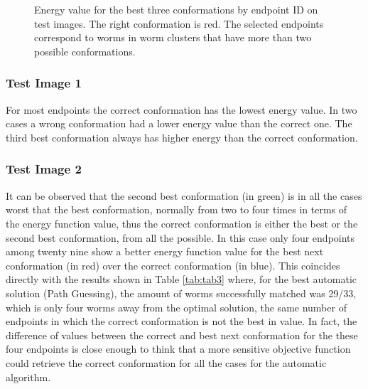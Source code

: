 \begin{figure}[htp]
  \begin{center}
     \\
     \\
  \end{center}
  \caption{Energy value for the best three conformations by endpoint ID on test
images. The right conformation is red. The selected endpoints correspond to worms in worm clusters that
have more than two possible conformations.}
  \label{fig:energy123}
\end{figure}


\subsubsection*{Test Image 1}


For most endpoints the correct conformation has the lowest energy value.
In two cases a wrong conformation had a lower energy value than the correct
one. The third best conformation always has higher energy than the correct conformation.\\

\subsubsection*{Test Image 2}


It can be observed that the second best conformation (in green) is in all 
the cases worst that the best conformation, normally from two to four times 
in terms of the energy function value, thus the correct conformation is 
either the best or the second best conformation, from all the possible.
In this case only four endpoints among twenty nine show a better energy
function value for the best next conformation (in red) over the correct 
conformation (in blue). This coincides directly with the results shown
in Table \ref{tab:tab3} where, for the best automatic solution (Path Guessing),
the amount of worms successfully matched was 29/33, which is only four worms
away from the optimal solution, the same number of endpoints in which the
correct conformation is not the best in value. In fact, the difference of 
values between the correct and best next conformation for the these four
endpoints is close enough to think that a more sensitive objective function
could retrieve the correct conformation for all the cases for the automatic
algorithm.\\ 

